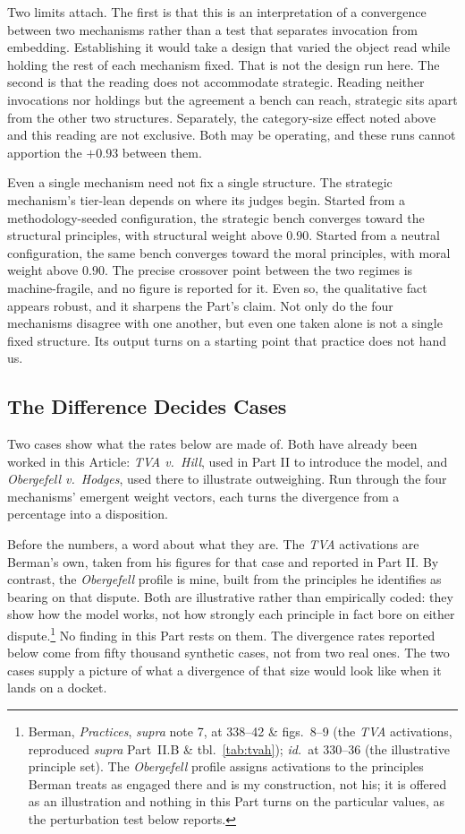 Two limits attach. The first is that this is an interpretation of a
convergence between two mechanisms rather than a test that separates
invocation from embedding.
Establishing it would take a design that varied the object read while
holding the rest of each mechanism fixed. That is not the design run here. The second is that the reading does not accommodate strategic. Reading neither
invocations nor holdings but the agreement a bench can reach, strategic
sits apart from the other two structures. Separately, the category-size effect noted
above and this reading are not exclusive. Both may be operating, and
these runs cannot apportion the $+0.93$ between them.

Even a single mechanism need not fix a single structure. The strategic mechanism's tier-lean depends on where its judges begin. Started from a
methodology-seeded configuration, the strategic bench converges toward
the structural principles, with structural weight above $0.90$. Started
from a neutral configuration, the same bench converges toward the moral
principles, with moral weight above $0.90$. The precise crossover point between the two regimes is
machine-fragile, and no figure is reported for it. Even so, the qualitative fact
appears robust, and it sharpens the
Part's claim. Not only do the four mechanisms disagree with one another, but even one
taken alone is not a single fixed structure. Its output turns on a starting point that
practice does not hand us.

\subsection{The Difference Decides Cases}

Two cases show what the rates below are made of. Both have already been worked in this Article: \textit{TVA v.\ Hill}, used in
Part II to introduce the model, and \textit{Obergefell v.\ Hodges},
used there to illustrate outweighing. Run through the four
mechanisms' emergent weight vectors, each turns the divergence from a
percentage into a disposition.

Before the numbers, a word about what they are. The \textit{TVA}
activations are Berman's own, taken from his figures for that case and
reported in Part II. By contrast, the \textit{Obergefell} profile is mine, built from the
principles he identifies as bearing on that dispute. Both are
illustrative rather than empirically coded: they show how the model
works, not how strongly each principle in fact bore on either
dispute.\footnote{Berman, \textit{Practices}, \textit{supra} note 7, at
338--42 \& figs.\ 8--9 (the \textit{TVA} activations, reproduced
\textit{supra} Part~II.B \& tbl.~\ref{tab:tvah}); \textit{id.}\ at
330--36 (the illustrative principle set). The \textit{Obergefell} profile
assigns activations to the principles Berman treats as engaged there and
is my construction, not his; it is offered as an illustration and nothing
in this Part turns on the particular values, as the perturbation test
below reports.}
No finding in this Part rests on them. The divergence rates reported below come from fifty thousand synthetic
cases, not from two real ones. The two cases supply a picture of
what a divergence of that size would look like when it lands on a docket.


